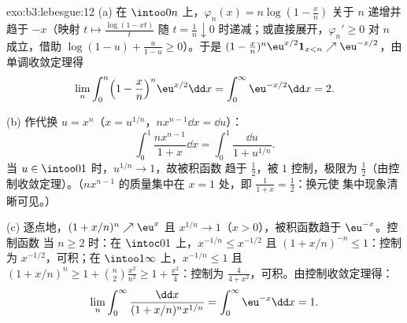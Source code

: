 \begin{solution}{exo:b3:lebesgue:12}
(a) 在 $\intoo0n$ 上，$\varphi_n(x) = n\log(1 - \frac xn)$
关于 $n$ 递增并趋于 $-x$（映射 $t \mapsto
\frac{\log(1 - xt)}{t}$ 随 $t = \frac1n
\downarrow 0$ 时递减；或直接展开，$\varphi_{n}' \geq 0$ 对 $n$ 成立，借助
$\log(1-u) + \frac{u}{1-u} \geq 0$）。于是 $(1 -
\frac xn)^n\eu^{x/2}\mathbf 1_{x<n} \nearrow
\eu^{-x/2}$，由单调收敛定理得
\[
\lim_n\int_0^n\Bigl(1 - \frac xn\Bigr)^n\eu^{x/2}\dd x =
\int_0^\infty\eu^{-x/2}\dd x = 2 .
\]

(b) 作代换 $u = x^n$（$x = u^{1/n}$，$n x^{n-1}\dd x =
\dd u$）：
\[
\int_0^1\frac{nx^{n-1}}{1 + x}\dd x =
\int_0^1\frac{\dd u}{1 + u^{1/n}} .
\]
当 $u \in \intoo01$ 时，$u^{1/n} \to 1$，故被积函数
趋于 $\frac12$，被 $1$ 控制，极限为
$\frac12$（由控制收敛定理）。（$nx^{n-1}$ 的质量集中在 $x
= 1$ 处，即 $\frac1{1+x} = \frac12$：换元使
集中现象清晰可见。）

(c) 逐点地，$(1 + x/n)^n \nearrow \eu^x$ 且 $x^{1/n} \to
1$（$x > 0$），被积函数趋于 $\eu^{-x}$。控制函数
当 $n \geq 2$ 时：在 $\intoc01$ 上，$x^{-1/n} \leq x^{-1/2}$ 且
$(1 + x/n)^{-n} \leq 1$：控制为 $x^{-1/2}$，可积；在
$\intoo1\infty$ 上，$x^{-1/n} \leq 1$ 且 $(1 + x/n)^n \geq 1 +
\binom n2\frac{x^2}{n^2} \geq 1 + \frac{x^2}4$：控制为
$\frac{4}{4 + x^2}$，可积。由控制收敛定理得：
\[
\lim_n\int_0^\infty\frac{\dd x}{(1 + x/n)^nx^{1/n}} =
\int_0^\infty\eu^{-x}\dd x = 1 .
\]
\end{solution}

